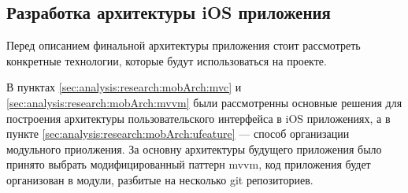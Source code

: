 \subsection{Разработка архитектуры iOS приложения}
\label{sec:development:arch:ios}

Перед описанием финальной архитектуры приложения стоит рассмотреть конкретные технологии, которые будут использоваться на проекте.








В пунктах \ref{sec:analysis:research:mobArch:mvc} и \ref{sec:analysis:research:mobArch:mvvm} были рассмотренны основные решения для построения архитектуры пользовательского интерфейса в iOS приложениях, а в пункте \ref{sec:analysis:research:mobArch:ufeature} --- способ организации модульного приолжения. За основну архитектуры будущего приложения было принято выбрать модифицированный паттерн \gls{mvvm}, код приложения будет организован в модули, разбитые на несколько git репозиториев. 